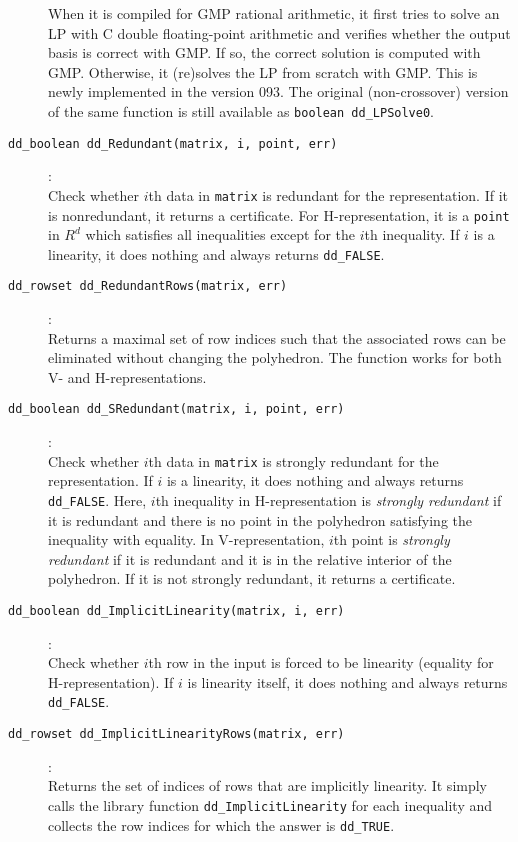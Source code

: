 \documentclass[11pt]{article}
\newcommand {\0} {{\bf 0}}
\begin{document}
\begin{description}
When it is compiled for GMP rational
arithmetic, it first tries to solve an LP with C  double
floating-point arithmetic and verifies whether the output
basis is correct with GMP.  If so, the correct solution is
computed with GMP.  Otherwise, it (re)solves the LP
from scratch with GMP.   This is newly implemented
in the version 093.  The original (non-crossover) version of 
the same function is still  available as {\tt boolean dd\_LPSolve0}.

\item[{\tt dd\_boolean dd\_Redundant(matrix, i, point, err)}]:\\
Check whether $i$th data in {\tt matrix} is redundant for the representation.
If it is nonredundant, it returns a certificate.  For H-representation,
it is a {\tt point} in $R^d$ which satisfies
all inequalities except for the $i$th inequality.  If $i$ is a linearity,
it does nothing and always returns {\tt dd\_FALSE}.

\item[{\tt dd\_rowset dd\_RedundantRows(matrix, err)}]:\\
Returns a maximal set of row indices such that the associated rows
can be eliminated without changing the polyhedron.  
The function works for both V- and H-representations.

\item[{\tt dd\_boolean dd\_SRedundant(matrix, i, point, err)}]:\\
Check whether $i$th data in {\tt matrix} is strongly redundant for the representation.
If $i$ is a linearity, it does nothing and always returns {\tt dd\_FALSE}.
Here,  $i$th inequality in H-representation is {\em strongly redundant\/} if it is redundant 
and there is no point in the polyhedron satisfying the inequality with equality.
In V-representation,  $i$th point is {\em strongly redundant\/} if it is redundant 
and it is in the relative interior of the polyhedron. If it is not strongly redundant, it returns a certificate.
 
\item[{\tt dd\_boolean dd\_ImplicitLinearity(matrix, i, err)}]:\\
Check whether $i$th row
in the input is forced to be linearity (equality 
for H-representation).
If $i$ is linearity itself, 
it does nothing and always returns {\tt dd\_FALSE}.

\item[{\tt dd\_rowset dd\_ImplicitLinearityRows(matrix, err)}]:\\
Returns the set of indices of rows that are 
implicitly linearity.  It simply calls the library function
{\tt dd\_ImplicitLinearity} for each inequality and collects
the row indices for which the answer is {\tt dd\_TRUE}.


\end{description}
\end{document}
